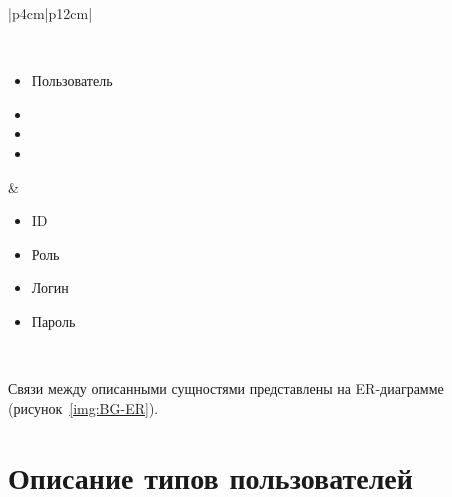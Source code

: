 \begin{table}[h!]
\begin{center}
\begin{threeparttable}
\begin{tabular}{|p{4cm}|p{12cm}|}
\begin{minipage}[t]{\linewidth}
\begin{multicols}{2}
\begin{itemize}[leftmargin=0mm,labelsep=0mm,nosep,after=\strut]
                \end{itemize}
              \end{multicols}
            \end{minipage}\\
            \hline
            \begin{minipage}[t]{\linewidth}
              \begin{multicols}{0}
                \begin{itemize}[leftmargin=0mm,labelsep=0mm,nosep,after=\strut]
                  \item[] Пользователь
                  \item[]
                  \item[]
                  \item[]
                \end{itemize}
              \end{multicols}
            \end{minipage}
          & \begin{minipage}[t]{\linewidth}
              \begin{multicols}{2}
                \begin{itemize}[leftmargin=0mm,labelsep=0mm,nosep,after=\strut]
                  \item[] ID
                  \item[] Роль
                  \item[] Логин
                  \item[] Пароль
                \end{itemize}
              \end{multicols}
            \end{minipage}\\
           \hline
        \end{tabular}
    \end{threeparttable}
    \end{center}
\end{table} 

Связи между описанными сущностями представлены на ER-диаграмме
(рисунок~\ref{img:BG-ER}).


\section{Описание типов пользователей}

